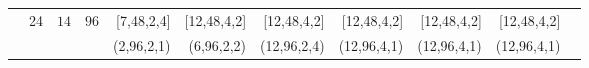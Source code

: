 \begin{table}[]
\begin{threeparttable}
\begin{tabular}{lrrrrrrrrrr }
\rowcolor{Gray}\multirow{-2}{*}{\textbf{CONV7}} &\multirow{-2}{*}{24}&\multirow{-2}{*}{$14$} & \multirow{-2}{*}{$96$}&[\hspace{0.5em}7,\hspace{1em}48,\hspace{0.5em}2,\hspace{0.5em}\hspace{0.5em}4] &[12,\hspace{1em}48,\hspace{0.5em}4,\hspace{0.5em}\hspace{0.5em}2] &[12,\hspace{1em}48,\hspace{0.5em}4,\hspace{0.5em}\hspace{0.5em}2] &[12,\hspace{1em}48,\hspace{0.5em}4,\hspace{0.5em}\hspace{0.5em}2] &[12,\hspace{1em}48,\hspace{0.5em}4,\hspace{0.5em}\hspace{0.5em}2] &[12,\hspace{1em}48,\hspace{0.5em}4,\hspace{0.5em}\hspace{0.5em}2] \\
& & & &(\hspace{0.5em}2,\hspace{1em}96,\hspace{0.5em}2,\hspace{0.5em}\hspace{0.5em}1) &(\hspace{0.5em}6,\hspace{1em}96,\hspace{0.5em}2,\hspace{0.5em}\hspace{0.5em}2) &(12,\hspace{1em}96,\hspace{0.5em}2,\hspace{0.5em}\hspace{0.5em}4) &(12,\hspace{1em}96,\hspace{0.5em}4,\hspace{0.5em}\hspace{0.5em}1) &(12,\hspace{1em}96,\hspace{0.5em}4,\hspace{0.5em}\hspace{0.5em}1) &(12,\hspace{1em}96,\hspace{0.5em}4,\hspace{0.5em}\hspace{0.5em}1) \\

\end{tabular}
\end{threeparttable}
\end{table}

